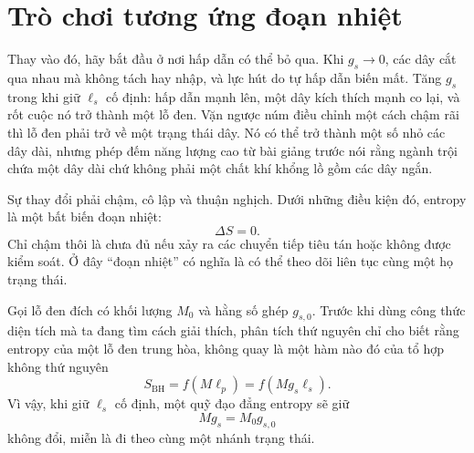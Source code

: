\begin{classroomqa}
\end{classroomqa}

\section{Trò chơi tương ứng đoạn nhiệt}

Thay vào đó, hãy bắt đầu ở nơi hấp dẫn có thể bỏ qua. Khi \(g_s\to0\), các dây cắt qua nhau mà không tách hay nhập, và lực hút do tự hấp dẫn biến mất. Tăng \(g_s\) trong khi giữ \(\ell_s\) cố định: hấp dẫn mạnh lên, một dây kích thích mạnh co lại, và rốt cuộc nó trở thành một lỗ đen. Vặn ngược núm điều chỉnh một cách chậm rãi thì lỗ đen phải trở về một trạng thái dây. Nó có thể trở thành một số nhỏ các dây dài, nhưng phép đếm năng lượng cao từ bài giảng trước nói rằng ngành trội chứa một dây dài chứ không phải một chất khí khổng lồ gồm các dây ngắn.

\begin{classroomqa}
\end{classroomqa}

Sự thay đổi phải chậm, cô lập và thuận nghịch. Dưới những điều kiện đó, entropy là một bất biến đoạn nhiệt:
\begin{equation}
\Delta S=0.
\label{eq:l07-adiabatic}
\end{equation}
Chỉ chậm thôi là chưa đủ nếu xảy ra các chuyển tiếp tiêu tán hoặc không được kiểm soát. Ở đây ``đoạn nhiệt'' có nghĩa là có thể theo dõi liên tục cùng một họ trạng thái.

Gọi lỗ đen đích có khối lượng \(M_0\) và hằng số ghép \(g_{s,0}\). Trước khi dùng công thức diện tích mà ta đang tìm cách giải thích, phân tích thứ nguyên chỉ cho biết rằng entropy của một lỗ đen trung hòa, không quay là một hàm nào đó của tổ hợp không thứ nguyên
\begin{equation}
S_{\mathrm{BH}}=f(M\ell_p)
=f(Mg_s\ell_s).
\label{eq:l07-entropy-function}
\end{equation}
Vì vậy, khi giữ \(\ell_s\) cố định, một quỹ đạo đẳng entropy sẽ giữ
\begin{equation}
Mg_s=M_0g_{s,0}
\label{eq:l07-adiabat}
\end{equation}
không đổi, miễn là đi theo cùng một nhánh trạng thái.

